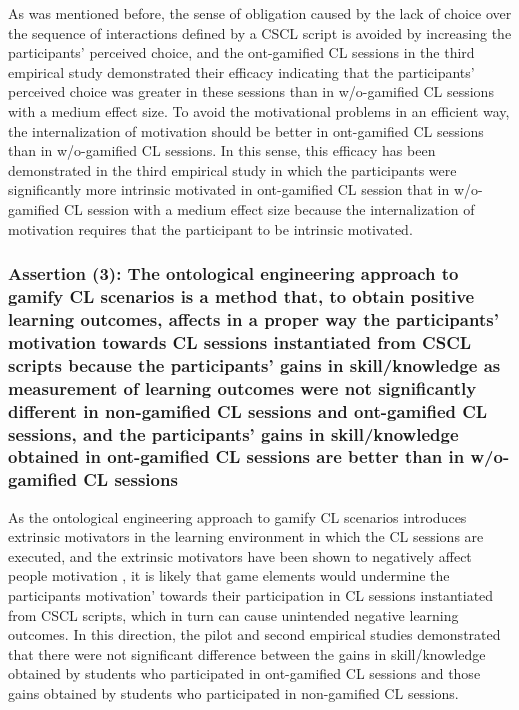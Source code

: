 As was mentioned before, the sense of obligation caused by the lack of choice over the sequence of interactions defined by a CSCL script is avoided by increasing the participants' perceived choice, and the ont-gamified CL sessions in the third empirical study demonstrated their efficacy indicating that the participants' perceived choice  was greater in these sessions than in w/o-gamified CL sessions with a medium effect size. 
To avoid the motivational problems in an efficient way, the internalization of motivation should be better in ont-gamified CL sessions than in w/o-gamified CL sessions. In this sense, this efficacy has been demonstrated in the third empirical study in which the participants were significantly more intrinsic motivated in ont-gamified CL session that in w/o-gamified CL session with a medium effect size because the internalization of motivation requires that the participant to be intrinsic motivated.

\subsubsection*{Assertion (3): The ontological engineering approach to gamify CL scenarios is a method that, to obtain positive learning outcomes, affects in a proper way the participants' motivation towards CL sessions instantiated from CSCL scripts because the participants' gains in skill/knowledge as measurement of learning outcomes were not significantly different in non-gamified CL sessions and ont-gamified CL sessions, and the participants' gains in skill/knowledge obtained in ont-gamified CL sessions are better than in w/o-gamified CL sessions}

As the ontological engineering approach to gamify CL scenarios introduces extrinsic motivators in the learning environment in which the CL sessions are executed, and the extrinsic motivators have been shown to negatively affect people motivation \cite{BenabouTirole2003, FreyJegen1999}, it is likely that game elements would undermine the participants motivation' towards their participation in CL sessions instantiated from CSCL scripts, which in turn can cause unintended negative learning outcomes. In this direction, the pilot and second empirical studies demonstrated that there were not significant difference between the gains in skill/knowledge obtained by students who participated in ont-gamified CL sessions and those gains obtained by students who participated in non-gamified CL sessions.


